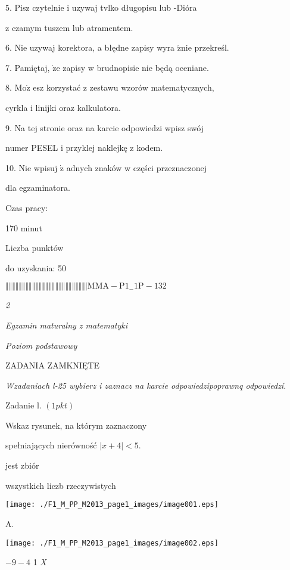 \documentclass[a4paper,12pt]{article}
\begin{document}
5. Pisz czytelnie i uzywaj tvlko długopisu lub -Dióra

z czamym tuszem lub atramentem.

6. Nie uzywaj korektora, a błędne zapisy wyra $\acute{\mathrm{z}}\mathrm{n}\mathrm{i}\mathrm{e}$ przekreśl.

7. Pamiętaj, $\dot{\mathrm{z}}\mathrm{e}$ zapisy w brudnopisie nie będą oceniane.

8. $\mathrm{M}\mathrm{o}\dot{\mathrm{z}}$ esz korzystać z zestawu wzorów matematycznych,

cyrkla i linijki oraz kalkulatora.

9. Na tej stronie oraz na karcie odpowiedzi wpisz swój

numer PESEL i przyklej naklejkę z kodem.

10. Nie wpisuj $\dot{\mathrm{z}}$ adnych znaków w części przeznaczonej

dla egzaminatora.

Czas pracy:

170 minut

Liczba punktów

do uzyskania: 50

$\Vert\Vert\Vert\Vert\Vert\Vert\Vert\Vert\Vert\Vert\Vert\Vert\Vert\Vert\Vert\Vert\Vert\Vert\Vert\Vert\Vert\Vert\Vert\Vert|  \mathrm{M}\mathrm{M}\mathrm{A}-\mathrm{P}1_{-}1\mathrm{P}-132$




{\it 2}

{\it Egzamin maturalny z matematyki}

{\it Poziom podstawowy}

ZADANIA ZAMKNIĘTE

{\it Wzadaniach l-25 wybierz i zaznacz na karcie odpowiedzipoprawnq odpowiedzí}.

Zadanie l. $(1pkt)$

Wskaz rysunek, na którym zaznaczony

spełniających nierówność $|x+4|<5.$

jest zbiór

wszystkich liczb rzeczywistych
\begin{center}
\texttt{[image: ./F1\_M\_PP\_M2013\_page1\_images/image001.eps]}
\end{center}
A.
\begin{center}
\texttt{[image: ./F1\_M\_PP\_M2013\_page1\_images/image002.eps]}
\end{center}
$-9  -4$  1  {\it X}
\end{document}
